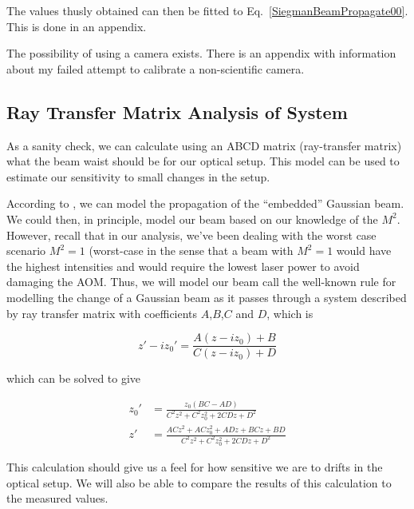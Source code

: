 The values thusly obtained can then be fitted to Eq.\ \ref{SiegmanBeamPropagate00}. This is done in an appendix. 


The possibility of using a camera exists. There is an appendix with information about my failed attempt to calibrate a non-scientific camera. 


\subsection{Ray Transfer Matrix Analysis of System}
As a sanity check, we can calculate using an ABCD matrix (ray-transfer matrix) what the beam waist should be for our optical setup. This model can be used to estimate our sensitivity to small changes in the setup. 


According to \cite{SiegmanBeamQuality}, we can model the propagation of the ``embedded'' Gaussian beam. We could then, in principle, model our beam based on our knowledge of the $M^2$. However, recall that in our analysis, we've been dealing with the worst case scenario $M^2=1$ (worst-case in the sense that a beam with $M^2=1$ would have the highest intensities and would require the lowest laser power to avoid damaging the AOM. Thus, we will model our beam call the well-known rule for modelling the change of a Gaussian beam as it passes through a system described by ray transfer matrix with coefficients $A$,$B$,$C$ and $D$, which is 

\begin{equation}
z'-iz_0'=\frac{A(z-iz_0)+B}{C(z-iz_0)+D}
\end{equation}
\cite{BYUOpticsBook}

which can be solved to give 

\begin{align}
z_0' &= \frac{ z_0 (BC-AD)}{C^2z^2+C^2z_0^2+2 C D z + D^2} \\
z' &=\frac{AC z^2+ACz_0^2+ADz+BCz+BD}{C^2z^2+C^2z_0^2+2 C D z + D^2}
\end{align}

This calculation should give us a feel for how sensitive we are to drifts in the optical setup. We will also be able to compare the results of this calculation to the measured values. 

